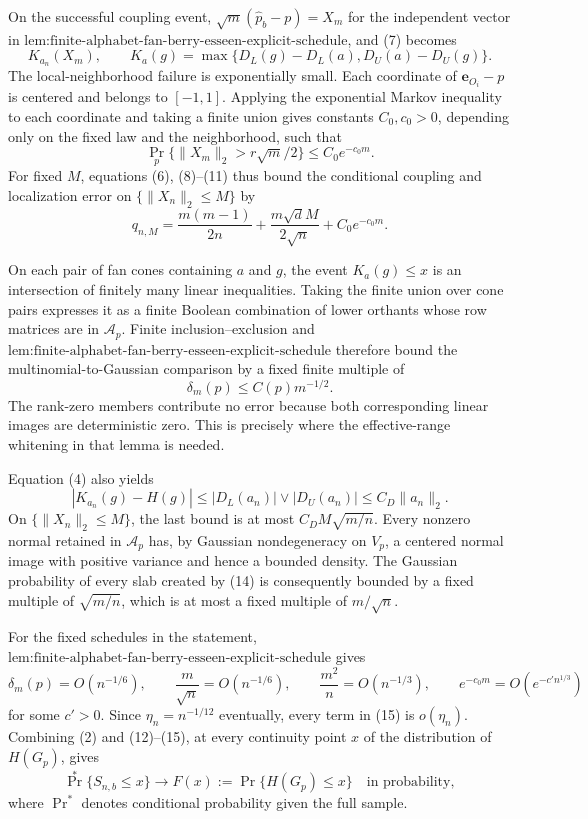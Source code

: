 On the successful coupling event, \(\sqrt m(\widehat p_b-p)=X_m\) for the independent vector in \(\text{lem:finite-alphabet-fan-berry-esseen-explicit-schedule}\), and (7) becomes
\[
K_{a_n}(X_m),
\qquad
K_a(g)=\max\{D_L(g)-D_L(a),D_U(a)-D_U(g)\}.
\tag{10}
\]
The local-neighborhood failure is exponentially small.  Each coordinate of \(\mathbf e_{O_i}-p\) is centered and belongs to \([-1,1]\).  Applying the exponential Markov inequality to each coordinate and taking a finite union gives constants \(C_0,c_0>0\), depending only on the fixed law and the neighborhood, such that
\[
\Pr_p\{\|X_m\|_2>r\sqrt m/2\}\leq C_0e^{-c_0m}.
\tag{11}
\]
For fixed \(M\), equations (6), (8)--(11) thus bound the conditional coupling and localization error on \(\{\|X_n\|_2\leq M\}\) by
\[
q_{n,M}=\frac{m(m-1)}{2n}
+\frac{m\sqrt d M}{2\sqrt n}+C_0e^{-c_0m}.
\tag{12}
\]

On each pair of fan cones containing \(a\) and \(g\), the event \(K_a(g)\leq x\) is an intersection of finitely many linear inequalities.  Taking the finite union over cone pairs expresses it as a finite Boolean combination of lower orthants whose row matrices are in \(\mathcal A_p\).  Finite inclusion--exclusion and \(\text{lem:finite-alphabet-fan-berry-esseen-explicit-schedule}\) therefore bound the multinomial-to-Gaussian comparison by a fixed finite multiple of
\[
\delta_m(p)\leq C(p)m^{-1/2}.
\tag{13}
\]
The rank-zero members contribute no error because both corresponding linear images are deterministic zero.  This is precisely where the effective-range whitening in that lemma is needed.

Equation (4) also yields
\[
|K_{a_n}(g)-H(g)|
\leq |D_L(a_n)|\vee|D_U(a_n)|
\leq C_D\|a_n\|_2.
\tag{14}
\]
On \(\{\|X_n\|_2\leq M\}\), the last bound is at most \(C_DM\sqrt{m/n}\).  Every nonzero normal retained in \(\mathcal A_p\) has, by Gaussian nondegeneracy on \(V_p\), a centered normal image with positive variance and hence a bounded density.  The Gaussian probability of every slab created by (14) is consequently bounded by a fixed multiple of \(\sqrt{m/n}\), which is at most a fixed multiple of \(m/\sqrt n\).

For the fixed schedules in the statement, \(\text{lem:finite-alphabet-fan-berry-esseen-explicit-schedule}\) gives
\[
\delta_m(p)=O(n^{-1/6}),\qquad
\frac m{\sqrt n}=O(n^{-1/6}),\qquad
\frac{m^2}{n}=O(n^{-1/3}),\qquad
e^{-c_0m}=O(e^{-c'n^{1/3}})
\tag{15}
\]
for some \(c'>0\).  Since \(\eta_n=n^{-1/12}\) eventually, every term in (15) is \(o(\eta_n)\).  Combining (2) and (12)--(15), at every continuity point \(x\) of the distribution of \(H(G_p)\), gives
\[
\Pr^*\{S_{n,b}\leq x\}\longrightarrow
F(x):=\Pr\{H(G_p)\leq x\}
\quad\text{in probability},
\tag{16}
\]
where \(\Pr^*\) denotes conditional probability given the full sample.

